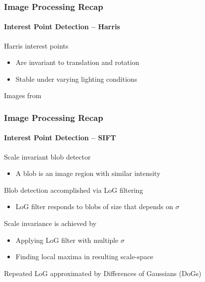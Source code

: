 \documentclass[xetex,professionalfont]{beamer}
\begin{document}
\begin{frame}
\frametitle{Image Processing Recap}
\framesubtitle{Interest Point Detection -- Harris}

Harris interest points
\begin{itemize}
    \item Are invariant to translation and rotation
    \item Stable under varying lighting conditions %
\end{itemize} %

\medskip
\begin{center}
    {\centering Images from \cite{tuytelaars2008}}
\end{center}

\end{frame}


\begin{frame}
\frametitle{Image Processing Recap}
\framesubtitle{Interest Point Detection -- SIFT}

Scale invariant blob detector
\begin{itemize}
    \item A blob is an image region with similar intensity %
\end{itemize}

\bigskip
Blob detection accomplished via LoG filtering
\begin{itemize}
    \item LoG filter responds to blobs of size that depends on $\sigma$
\end{itemize}

\bigskip
Scale invariance is achieved by
\begin{itemize}
    \item Applying LoG filter with multiple $\sigma$
    \item Finding local maxima in resulting scale-space
\end{itemize}

\bigskip
Repeated LoG approximated by Differences of Gaussians (DoGs)

\end{frame}
\end{document}
